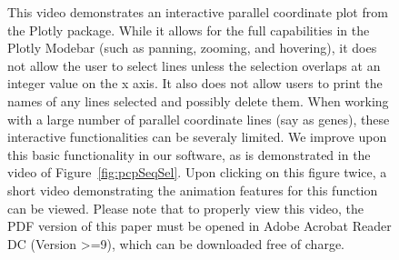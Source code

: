 \documentclass[11pt,a4paper,oldfontcommands,openany]{memoir}
\numberwithin{equation}{section} %
\begin{document}
\begin{figure}[H]
    \begin{framed}
    \centering
    \end{framed}
    \caption{This video demonstrates an interactive parallel coordinate plot from the Plotly package. While it allows for the full capabilities in the Plotly Modebar (such as panning, zooming, and hovering), it does not allow the user to select lines unless the selection overlaps at an integer value on the x axis. It also does not allow users to print the names of any lines selected and possibly delete them. When working with a large number of parallel coordinate lines (say as genes), these interactive functionalities can be severaly limited. We improve upon this basic functionality in our software, as is demonstrated in the video of Figure~\ref{fig:pcpSeqSel}. Upon clicking on this figure twice, a short video demonstrating the animation features for this function can be viewed. Please note that to properly view this video, the PDF version of this paper must be opened in Adobe Acrobat Reader DC (Version >=9), which can be downloaded free of charge.}
    \label{fig:pcpPlotlyMarkers}
\end{figure}
\end{document}
